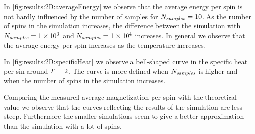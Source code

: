 	In \cref{fig:results:2D:averageEnergy} we observe that the average energy per spin is not hardly influenced by the number of samples for $N_\textit{samples} = 10$. As the number of spins in the simulation increases, the difference between the simulation with $N_\textit{samples} = \num{1.e+3}$ and $N_\textit{samples} = \num{1.e+4}$ increases. In general we observe that the average energy per spin increases as the temperature increases.

	In \cref{fig:results:2D:specificHeat} we observe a bell-shaped curve in the specific heat per sin around $T = 2$. The curve is more defined when $N_\textit{samples}$ is higher and when the number of spins in the simulation increases.

	Comparing the measured average magnetization per spin with the theoretical value we observe that the curves reflecting the results of the simulation are less steep. Furthermore the smaller simulations seem to give a better approximation than the simulation with a lot of spins. 

